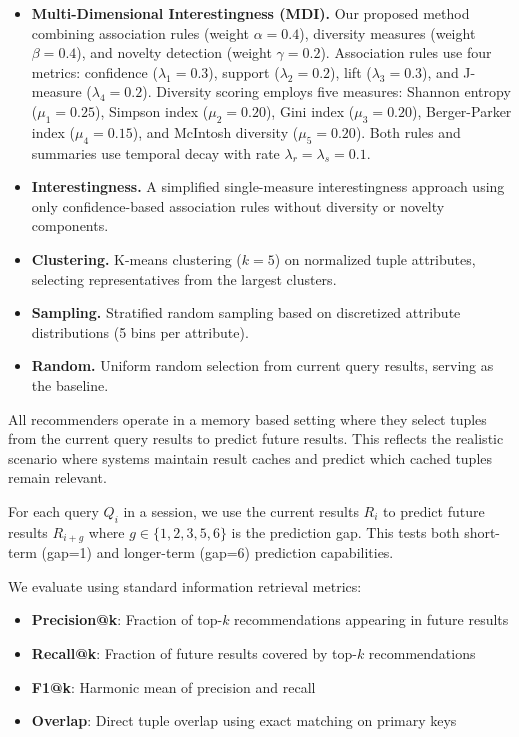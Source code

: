 \documentclass[sigconf, nonacm]{acmart}
\begin{document}
\begin{itemize}
  \item \textbf{Multi-Dimensional Interestingness (MDI).} Our proposed method combining association rules (weight $\alpha=0.4$), diversity measures (weight $\beta=0.4$), and novelty detection (weight $\gamma=0.2$). Association rules use four metrics: confidence ($\lambda_1=0.3$), support ($\lambda_2=0.2$), lift ($\lambda_3=0.3$), and J-measure ($\lambda_4=0.2$). Diversity scoring employs five measures: Shannon entropy ($\mu_1=0.25$), Simpson index ($\mu_2=0.20$), Gini index ($\mu_3=0.20$), Berger-Parker index ($\mu_4=0.15$), and McIntosh diversity ($\mu_5=0.20$). Both rules and summaries use temporal decay with rate $\lambda_r = \lambda_s = 0.1$.

  \item \textbf{Interestingness.} A simplified single-measure interestingness approach using only confidence-based association rules without diversity or novelty components.

  \item \textbf{Clustering.} K-means clustering ($k=5$) on normalized tuple attributes, selecting representatives from the largest clusters.

  \item \textbf{Sampling.} Stratified random sampling based on discretized attribute distributions (5 bins per attribute).

  \item \textbf{Random.} Uniform random selection from current query results, serving as the baseline.
\end{itemize}

All recommenders operate in a memory based setting where they select tuples from the current query results to predict future results. This reflects the realistic scenario where systems maintain result caches and predict which cached tuples remain relevant.

For each query $Q_i$ in a session, we use the current results $R_i$ to predict future results $R_{i+g}$ where $g \in \{1,2,3,5,6\}$ is the prediction gap. This tests both short-term (gap=1) and longer-term (gap=6) prediction capabilities.

We evaluate using standard information retrieval metrics:
\begin{itemize}
    \item \textbf{Precision@k}: Fraction of top-$k$ recommendations appearing in future results
    \item \textbf{Recall@k}: Fraction of future results covered by top-$k$ recommendations  
    \item \textbf{F1@k}: Harmonic mean of precision and recall
    \item \textbf{Overlap}: Direct tuple overlap using exact matching on primary keys
\end{itemize}
\end{document}
